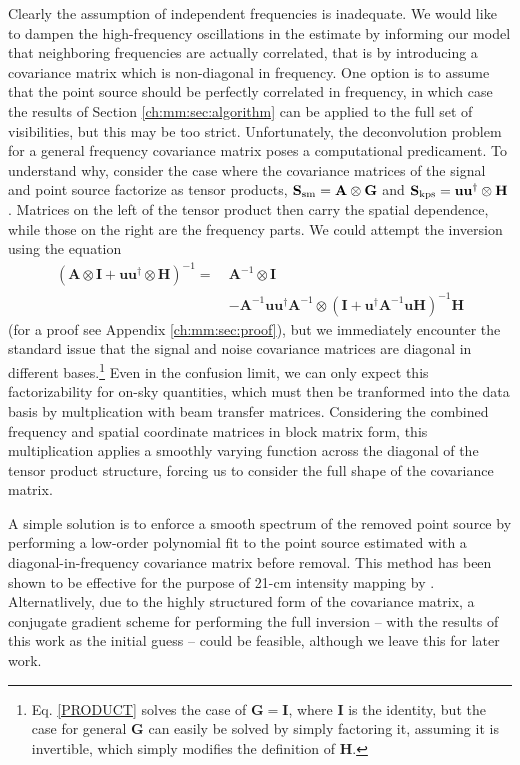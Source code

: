Clearly the assumption of independent frequencies is inadequate. We would like to dampen the high-frequency oscillations in the estimate by informing our model that neighboring frequencies are actually correlated, that is by introducing a covariance matrix which is non-diagonal in frequency. One option is to assume that the point source should be perfectly correlated in frequency, in which case the results of Section \ref{ch:mm:sec:algorithm} can be applied to the full set of visibilities, but this may be too strict. Unfortunately, the deconvolution problem for a general frequency covariance matrix poses a computational predicament. To understand why, consider the case where the covariance matrices of the signal and point source factorize as tensor products, $\mathbf{S}_{\rm sm} = \mathbf{A} \otimes\mathbf{G}$ and $\mathbf{S}_{\rm kps} = \mathbf{u}\mathbf{u}^\dagger \otimes\mathbf{H}$. Matrices on the left of the tensor product then carry the spatial dependence, while those on the right are the frequency parts. We could attempt the inversion using the equation
\begin{align}
\left(\mathbf{A} \otimes \mathbf{I} + \mathbf{u}\mathbf{u}^\dagger \otimes \mathbf{H} \right)^{-1} = ~& \mathbf{A}^{-1} \otimes \mathbf{I} \label{PRODUCT}
\\ &- \mathbf{A}^{-1}\mathbf{u}\mathbf{u}^\dagger\mathbf{A}^{-1} \otimes \left(\mathbf{I} + \mathbf{u}^\dagger\mathbf{A}^{-1}\mathbf{u} \mathbf{H}\right)^{-1} \mathbf{H} \nonumber
\end{align}
(for a proof see Appendix \ref{ch:mm:sec:proof}), but we immediately encounter the standard issue that the signal and noise covariance matrices are diagonal in different bases.\footnote{Eq. \eqref{PRODUCT} solves the case of $\mathbf{G}=\mathbf{I}$, where $\mathbf{I}$ is the identity, but the case for general $\mathbf{G}$ can easily be solved by simply factoring it, assuming it is invertible, which simply modifies the definition of $\mathbf{H}$.} Even in the confusion limit, we can only expect this factorizability for on-sky quantities, which must then be tranformed into the data basis by multplication with beam transfer matrices. Considering the combined frequency and spatial coordinate matrices in block matrix form, this multiplication applies a smoothly varying function across the diagonal of the tensor product structure, forcing us to consider the full shape of the covariance matrix.

A simple solution is to enforce a smooth spectrum of the removed point source by performing a low-order polynomial fit to the point source estimated with a diagonal-in-frequency covariance matrix before removal. This method has been shown to be effective for the purpose of 21-cm intensity mapping by \cite{barry2016}. Alternatlively, due to the highly structured form of the covariance matrix, a conjugate gradient scheme for performing the full inversion -- with the results of this work as the initial guess -- could be feasible, although we leave this for later work.

